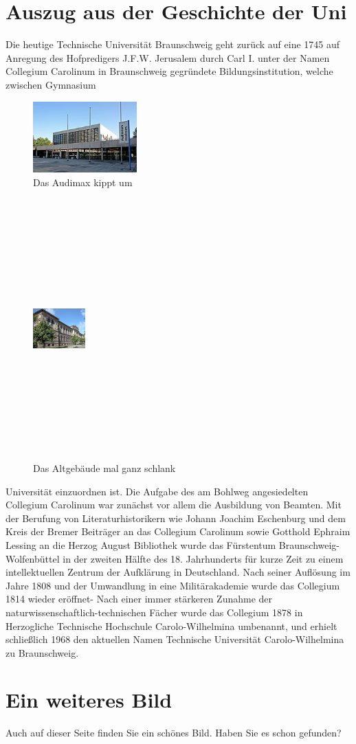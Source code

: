 \documentclass[12pt,a4paper, bibliography=totoc]{scrbook}
\begin{document}
\section{Auszug aus der Geschichte der Uni}
Die heutige Technische Universität Braunschweig geht zurück auf eine 1745  auf Anregung des Hofpredigers J.F.W. Jerusalem durch Carl I. unter der Namen Collegium Carolinum in Braunschweig gegründete 
Bildungsinstitution, welche zwischen Gymnasium

\begin{figure}[h]
	\begin{center}
		\includegraphics[width=4cm, angle=45]{audimax}
		\caption{Das Audimax kippt um}
	\end{center}
\end{figure}
\newpage
\begin{figure}[h]
	\begin{center}
		\includegraphics[width=2cm, height=10cm]{tu}
		\caption{Das Altgebäude mal ganz schlank}
	\end{center}
\end{figure}

\noindent Universität einzuordnen ist. Die Aufgabe des am Bohlweg angesiedelten Collegium Carolinum war
zunächst vor allem die Ausbildung von Beamten. Mit der Berufung von Literaturhistorikern wie Johann Joachim Eschenburg und dem Kreis der Bremer
Beiträger an das Collegium Carolinum sowie Gotthold Ephraim Lessing an die Herzog August Bibliothek wurde das Fürstentum Braunschweig-Wolfenbüttel in der zweiten Hälfte des 18. Jahrhunderts für kurze Zeit zu einem intellektuellen Zentrum der Aufklärung in Deutschland. Nach seiner Auflösung im Jahre 1808 und der Umwandlung in eine Militärakademie wurde das Collegium 1814 wieder eröffnet- Nach einer immer stärkeren Zunahme der naturwissenschaftlich-technischen Fächer wurde das Collegium 1878 in Herzogliche Technische Hochschule Carolo-Wilhelmina umbenannt, und erhielt schließlich 1968 den aktuellen Namen Technische Universität Carolo-Wilhelmina zu Braunschweig.
\section{Ein weiteres Bild}
Auch auf dieser Seite finden Sie ein schönes Bild. Haben Sie es schon gefunden?



\end{document}
